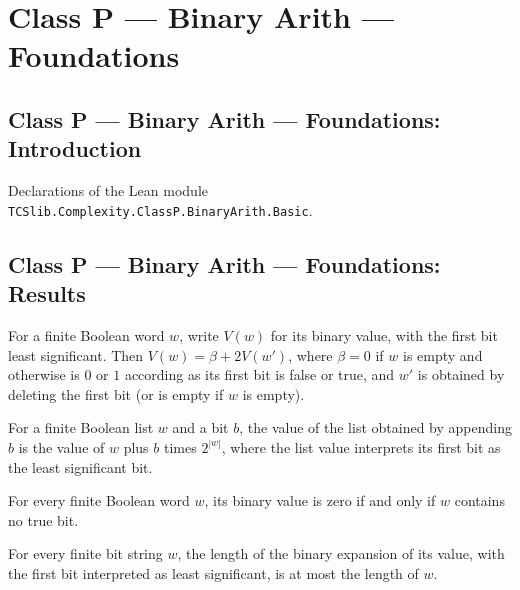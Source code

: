 \section{Class P --- Binary Arith --- Foundations}
\subsection*{Class P --- Binary Arith --- Foundations: Introduction}

Declarations of the Lean module \texttt{TCSlib.Complexity.ClassP.BinaryArith.Basic}.

\subsection*{Class P --- Binary Arith --- Foundations: Results}

\begin{theorem}
\label{Complexity.BinArith.bitsVal_eq_headD}
\leanok
{}
For a finite Boolean word $w$, write $V(w)$ for its binary value, with the first bit
least significant. Then $V(w)=\beta+2V(w')$, where $\beta=0$ if $w$ is empty and otherwise
is $0$ or $1$ according as its first bit is false or true, and $w'$ is obtained by
deleting the first bit (or is empty if $w$ is empty).
\end{theorem}

\begin{theorem}
\label{Complexity.BinArith.bitsVal_append_singleton}
\leanok
{}
For a finite Boolean list $w$ and a bit $b$, the value of the list obtained by appending
$b$ is the value of $w$ plus $b$ times $2^{|w|}$, where the list value interprets its
first bit as the least significant bit.
\end{theorem}

\begin{theorem}
\label{Complexity.BinArith.bitsVal_eq_zero_iff}
\leanok
{}
For every finite Boolean word $w$, its binary value is zero if and only if $w$ contains
no true bit.
\end{theorem}

\begin{theorem}
\label{Complexity.BinArith.length_bits_bitsVal_le}
\leanok
{}
For every finite bit string $w$, the length of the binary expansion of its value, with
the first bit interpreted as least significant, is at most the length of $w$.
\end{theorem}

